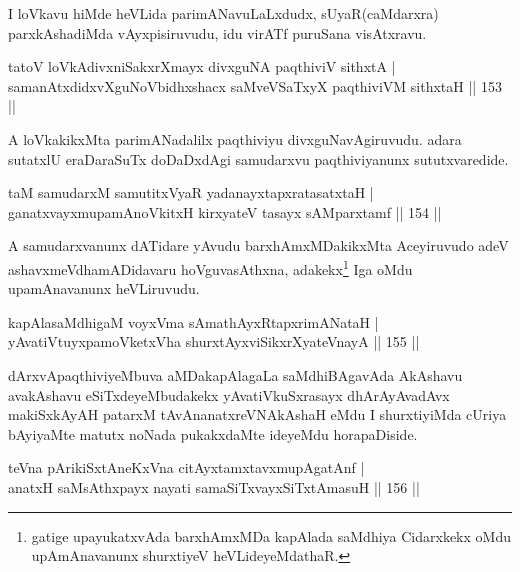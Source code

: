 \begin{artha}
I loVkavu hiMde heVLida parimANavuLaLxdudx, sUyaR(caMdarxra) parxkAshadiMda vAyxpisiruvudu, idu virATf puruSana visAtxravu.
\end{artha}

\begin{shl}
tatoV loVkAdivxniSakxrXmayx divxguNA paqthiviV sithxtA |\\
samanAtxdidxvXguNoV\s bidhxshacx saMveVSaTxyX paqthiviVM sithxtaH \hfill || 153 ||
\end{shl}

\begin{artha}
A loVkakikxMta parimANadalilx paqthiviyu divxguNavAgiruvudu. adara sutatxlU eraDaraSuTx doDaDxdAgi samudarxvu paqthiviyanunx sututxvaredide.
\end{artha}

\begin{shl}
taM samudarxM samutitxVyaR yadanayxtapxratasatxtaH |\\
ganatxvayxmupamAnoVkitxH kirxyateV tasayx sAMparxtamf \hfill || 154 ||
\end{shl}

\begin{artha}
A samudarxvanunx dATidare yAvudu barxhAmxMDakikxMta Aceyiruvudo adeV ashavxmeVdhamADidavaru hoVguvasAthxna, adakekx\footnote{gatige upayukatxvAda barxhAmxMDa  kapAlada saMdhiya Cidarxkekx oMdu upAmAnavanunx shurxtiyeV heVLideyeMdathaR.} Iga oMdu upamAnavanunx heVLiruvudu.
\end{artha}

\begin{shl}
kapAlasaMdhigaM voyxVma sAmathAyxRtapxrimANataH |\\
yAvatiVtuyxpamoVketxVha shurxtAyx\s \s viSikxrXyateV\s nayA \hfill || 155 ||
\end{shl}

\begin{artha}
dArxvApaqthiviyeMbuva aMDakapAlagaLa saMdhiBAgavAda AkAshavu avakAshavu eSiTxdeyeMbudakekx yAvatiVkuSxrasayx dhArAyAvadAvx makiSxkAyAH patarxM tAvAnanatxreVNAkAshaH eMdu I shurxtiyiMda cUriya bAyiyaMte matutx noNada pukakxdaMte ideyeMdu horapaDiside.
\end{artha}


\begin{shl}
teVna pArikiSxtAneKxVna citAyxtamxtavxmupAgatAnf |\\
anatxH saMsAthxpayx nayati samaSiTxvayxSiTxtAmasuH \hfill || 156 ||
\end{shl}

